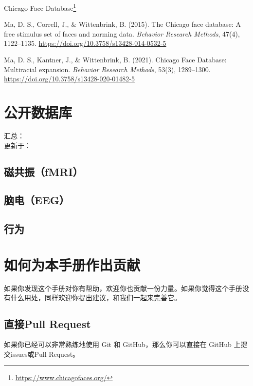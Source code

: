 \documentclass[]{ctexbook}
\renewcommand{\href}[2]{#2\footnote{\url{#1}}}
\theoremstyle{definition}
\theoremstyle{definition}
\theoremstyle{definition}
\theoremstyle{definition}
\theoremstyle{remark}
\begin{document}
\href{https://www.chicagofaces.org/}{Chicago Face Database}

Ma, D. S., Correll, J., \& Wittenbrink, B. (2015). The Chicago face database: A free stimulus set of faces and norming data. \emph{Behavior Research Methods}, 47(4), 1122--1135. \url{https://doi.org/10.3758/s13428-014-0532-5}

Ma, D. S., Kantner, J., \& Wittenbrink, B. (2021). Chicago Face Database: Multiracial expansion. \emph{Behavior Research Methods}, 53(3), 1289--1300. \url{https://doi.org/10.3758/s13428-020-01482-5}

\chapter{公开数据库}\label{opendata}

汇总：\\
更新于：

\section{磁共振（fMRI）}\label{ux78c1ux5171ux632ffmri}

\section{脑电（EEG）}\label{ux8111ux7535eeg}

\section{行为}\label{ux884cux4e3a}

\cleardoublepage

\appendix {}


\chapter{如何为本手册作出贡献}\label{contribute}

如果你发现这个手册对你有帮助，欢迎你也贡献一份力量。如果你觉得这个手册没有什么用处，同样欢迎你提出建议，和我们一起来完善它。

\section{直接Pull Request}\label{ux76f4ux63a5pull-request}

如果你已经可以非常熟练地使用 Git 和 GitHub，那么你可以直接在 GitHub 上提交issues或Pull Request。
\end{document}
